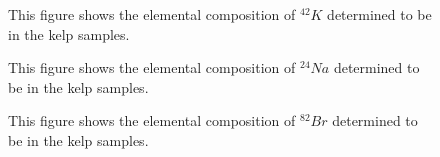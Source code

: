 \documentclass[]{article}
\begin{document}
\begin{figure}[h]
\centering
{}
\caption{This figure shows the elemental composition of $^{42}K$ determined to be in the kelp samples.}
\end{figure}


\begin{figure}[h]
\centering
{}
\caption{This figure shows the elemental composition of $^{24}Na$ determined to be in the kelp samples.}
\end{figure}


\begin{figure}[h]
\centering
{}
\caption{This figure shows the elemental composition of $^{82}Br$ determined to be in the kelp samples.}
\end{figure}
\end{document}
